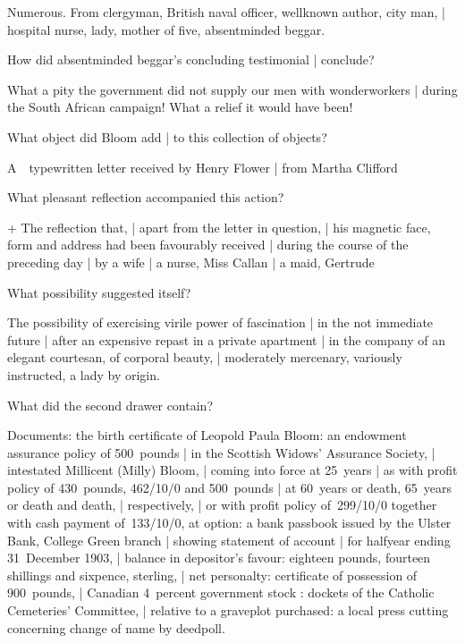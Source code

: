 \Adverts
Numerous.
From clergyman, British naval officer, wellknown author, city man, |
hospital nurse, lady, mother of five, absentminded beggar.


How did absentminded beggar's concluding testimonial |
conclude?

\Beggar
{}
What a pity the government did not supply our men with wonderworkers |
during the South African campaign!
What a relief it would have been!



What object did Bloom add |
to this collection of objects?%

\Science
A~~typewritten letter received by Henry Flower
 |
from Martha Clifford



What pleasant reflection accompanied this action?

\Memories + \Poetry
The reflection that, |
apart from the letter in question, |
his magnetic face, form and address had been favourably received |
during the course of the preceding day |
by a wife
 |
a nurse, Miss Callan
 |
a maid, Gertrude


What possibility suggested itself?

\Poetry[~(emotion)]
The possibility of exercising virile power of fascination |
in the not immediate future |
after an expensive repast in a private apartment |
in the company of an elegant courtesan, of corporal beauty, |
moderately mercenary, variously instructed, a lady by origin.



What did the second drawer contain?

\Turns
Documents:
the birth certificate of Leopold Paula Bloom:
an endowment assurance policy of 500~pounds |
in the Scottish Widows' Assurance Society, |
intestated Millicent (Milly) Bloom, |
coming into force at 25~years |
as with profit policy
of 430~pounds, 462/10/0 and 500~pounds |
at 60~years or death, 65~years or death and death, |
respectively, |
or with profit policy
of~299/10/0
together with cash payment of~133/10/0, at option:
a bank passbook issued by the Ulster Bank, College Green branch |
showing statement of account | %
for halfyear ending 31~December 1903, |
balance in depositor's favour:
eighteen pounds, fourteen shillings and sixpence, sterling, |
net personalty:
certificate of possession of 900~pounds, |
Canadian 4~percent
government stock
:
dockets of the Catholic Cemeteries'
Committee, |
relative to a graveplot purchased:
a local press cutting concerning change of name by deedpoll.


